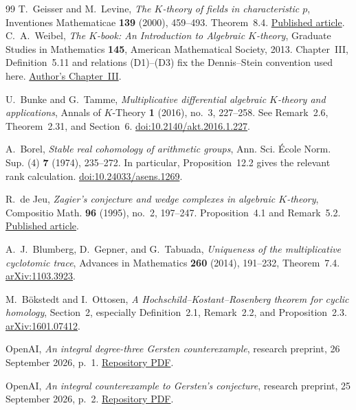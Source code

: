\documentclass[11pt,a4paper]{article}
\theoremstyle{remark}
\begin{document}
{\begin{thebibliography}{99}
T.~Geisser and M.~Levine, \emph{The $K$-theory of fields in
characteristic $p$}, Inventiones Mathematicae \textbf{139}
(2000), 459--493. Theorem~8.4.
\href{https://www2.rikkyo.ac.jp/web/geisser/p-part.pdf}{Published article}.
C.~A.~Weibel, \emph{The $K$-book: An Introduction to Algebraic $K$-theory}, Graduate Studies in Mathematics \textbf{145}, American Mathematical Society, 2013. Chapter~III, Definition~5.11 and relations (D1)--(D3) fix the Dennis--Stein convention used here.
\href{https://sites.math.rutgers.edu/~weibel/Kbook/Kbook.III.pdf}{Author's Chapter~III}.

U.~Bunke and G.~Tamme, \emph{Multiplicative differential algebraic $K$-theory and applications}, Annals of $K$-Theory \textbf{1} (2016), no.~3, 227--258. See Remark~2.6, Theorem~2.31, and Section~6.
\href{https://doi.org/10.2140/akt.2016.1.227}{doi:10.2140/akt.2016.1.227}.

A.~Borel, \emph{Stable real cohomology of arithmetic groups}, Ann. Sci. \'Ecole Norm. Sup. (4) \textbf{7} (1974), 235--272. In particular, Proposition~12.2 gives the relevant rank calculation.
\href{https://doi.org/10.24033/asens.1269}{doi:10.24033/asens.1269}.

R.~de Jeu, \emph{Zagier's conjecture and wedge complexes in algebraic $K$-theory}, Compositio Math. \textbf{96} (1995), no.~2, 197--247. Proposition~4.1 and Remark~5.2.
\href{https://www.numdam.org/article/CM_1995__96_2_197_0.pdf}{Published article}.

A.~J.~Blumberg, D.~Gepner, and G.~Tabuada,
\emph{Uniqueness of the multiplicative cyclotomic trace},
Advances in Mathematics \textbf{260} (2014), 191--232, Theorem~7.4.
\href{https://arxiv.org/abs/1103.3923}{arXiv:1103.3923}.

M.~B\"okstedt and I.~Ottosen,
\emph{A Hochschild--Kostant--Rosenberg theorem for cyclic homology},
Section~2, especially Definition~2.1, Remark~2.2, and Proposition~2.3.
\href{https://arxiv.org/abs/1601.07412}{arXiv:1601.07412}.

OpenAI, \emph{An integral degree-three Gersten counterexample},
research preprint, 26 September 2026, p.~1.
\href{https://github.com/openai/math/blob/main/preprints/An-Integral-Degree-Three-Gersten-Counterexample-September-26-2026/paper.pdf}{Repository PDF}.

OpenAI, \emph{An integral counterexample to Gersten's conjecture},
research preprint, 25 September 2026, p.~2.
\href{https://github.com/openai/math/blob/main/preprints/An-Integral-Counterexample-to-Gerstens-Conjecture-September-25-2026/An-Integral-Counterexample-to-Gerstens-Conjecture-September-25-2026.pdf}{Repository PDF}.

\end{thebibliography}}
\end{document}
